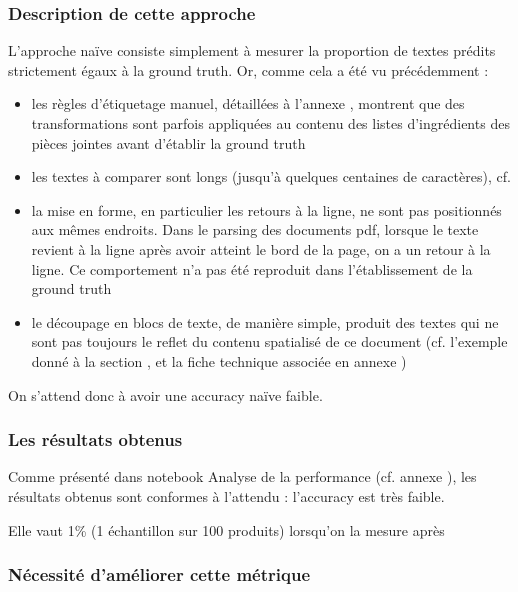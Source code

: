                 \subsubsection{Description de cette approche}

                L'approche \og naïve \fg consiste simplement à mesurer la proportion de textes prédits strictement égaux à la ground truth.
                Or, comme cela a été vu précédemment : 
                \begin{itemize}
                    \item les règles d'étiquetage manuel, détaillées à l'annexe , montrent que des transformations sont parfois appliquées au contenu des listes d'ingrédients des pièces jointes avant d'établir la ground truth
                    \item les textes à comparer sont longs (jusqu'à quelques centaines de caractères), cf. 
                    \item la mise en forme, en particulier les retours à la ligne, ne sont pas positionnés aux mêmes endroits. Dans le parsing des documents pdf, lorsque le texte revient à la ligne après avoir atteint le bord de la page, on a un retour à la ligne. Ce comportement n'a pas été reproduit dans l'établissement de la ground truth
                    \item le découpage en blocs de texte, de manière simple, produit des textes qui ne sont pas toujours le reflet du contenu spatialisé de ce document (cf. l'exemple donné à la section , et la fiche technique associée en annexe )
                \end{itemize}
                On s'attend donc à avoir une \og accuracy naïve \fg faible.

                \subsubsection{Les résultats obtenus}

                Comme présenté dans notebook \og Analyse de la performance \fg (cf. annexe ), les résultats obtenus sont conformes à l'attendu : l'accuracy est très faible.

                Elle vaut 1\% (1 échantillon sur 100 produits) lorsqu'on la mesure après 

                \subsubsection{Nécessité d'améliorer cette métrique}


